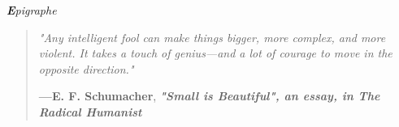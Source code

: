 \thispagestyle{empty}
\begin{center}
	 {\Large\textit{ \textbf Epigraphe}}
\end{center}
\vspace*{\fill} 
\begin{quote}
	\centering 
	\epigraph{\itshape "Any intelligent fool can make things bigger, more complex, and more violent. It takes a touch of genius—and a lot of courage to move in the opposite direction."}{\textbf{---E. F. Schumacher}, \textit\textbf{{"Small is Beautiful", an essay, in The Radical Humanist}}}
\end{quote}
\vspace*{\fill}